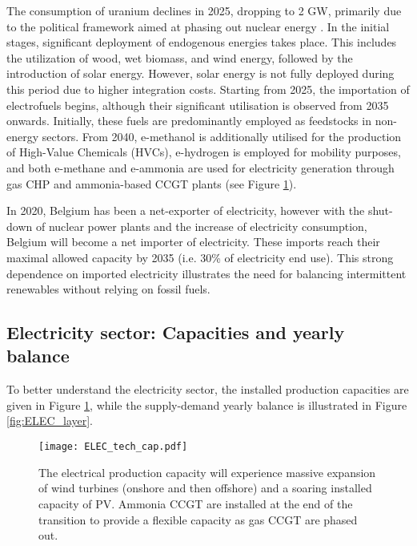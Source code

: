 The consumption of uranium declines in 2025, dropping to 2 GW, primarily due to the political framework aimed at phasing out nuclear energy \cite{nuclear_2035}. In the initial stages, significant deployment of endogenous energies takes place. This includes the utilization of wood, wet biomass, and wind energy, followed by the introduction of solar energy. However, solar energy is not fully deployed during this period due to higher integration costs. Starting from 2025, the importation of electrofuels begins, although their significant utilisation is observed from 2035 onwards. Initially, these fuels are predominantly employed as feedstocks in non-energy sectors. From 2040, e-methanol is additionally utilised for the production of High-Value Chemicals (HVCs), e-hydrogen is employed for mobility purposes, and both e-methane and e-ammonia are used for electricity generation through gas \gls{CHP} and ammonia-based \gls{CCGT} plants (see Figure \ref{fig:ELEC_tech_cap}).

In 2020, Belgium has been a net-exporter of electricity, however with the shut-down of nuclear power plants and the increase of electricity consumption, Belgium will become a net importer of electricity. These imports reach their maximal allowed capacity by 2035 (i.e. 30\% of electricity end use). This strong dependence on imported electricity illustrates the need for balancing intermittent renewables without relying on fossil fuels.

\subsection{Electricity sector: Capacities and yearly balance}
\label{subsubsec:elec_sector}
To better understand the electricity sector, the installed production capacities are given in Figure \ref{fig:ELEC_tech_cap}, while the supply-demand yearly balance is illustrated in Figure \ref{fig:ELEC_layer}.

\begin{figure}[!htbp]
     \centering
         \texttt{[image: ELEC\_tech\_cap.pdf]}
         \caption{The electrical production capacity will experience  massive expansion of wind turbines (onshore and then offshore) and a soaring installed capacity of \gls{PV}. Ammonia \gls{CCGT} are installed at the end of the transition to provide a flexible capacity as gas \gls{CCGT} are phased out.}
         \label{fig:ELEC_tech_cap}
\end{figure}


